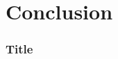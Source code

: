 \documentclass[handout,aspectratio=169]{beamer}
\begin{document}

\section[Conclusion]{Conclusion}


\begin{frame}
	\frametitle{Title}
		\begin{center}
	\end{center}
\end{frame} 

\begin{frame}[plain]
\begin{columns}
\column{\dimexpr\paperwidth-10pt}
\end{columns}
\end{frame} 
\end{document}
